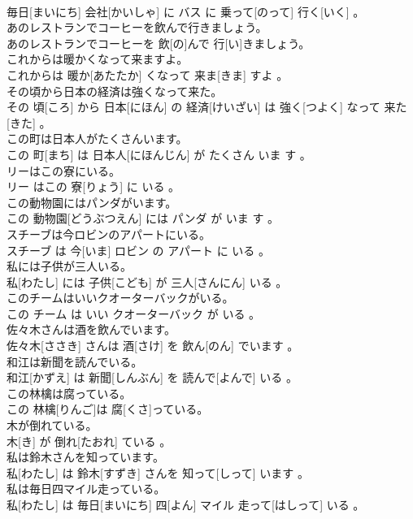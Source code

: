 \documentclass[8pt]{extreport}
\begin{document}
\begin{CJK}{UTF8}{min}
\\	毎日[まいにち] 会社[かいしゃ] に バス に 乗って[のって] 行く[いく] 。
\\	あのレストランでコーヒーを飲んで行きましょう。	
\\	あのレストランでコーヒーを 飲[の]んで 行[い]きましょう。
\\	これからは暖かくなって来ますよ。	
\\	これからは 暖か[あたたか] くなって 来ま[きま] すよ 。
\\	その頃から日本の経済は強くなって来た。	
\\	その 頃[ころ] から 日本[にほん] の 経済[けいざい] は 強く[つよく] なって 来た[きた] 。
\\	この町は日本人がたくさんいます。	
\\	この 町[まち] は 日本人[にほんじん] が たくさん いま す 。
\\	リーはこの寮にいる。	
\\	リー はこの 寮[りょう] に いる 。
\\	この動物園にはパンダがいます。	
\\	この 動物園[どうぶつえん] には パンダ が いま す 。
\\	スチーブは今ロビンのアパートにいる。	
\\	スチーブ は 今[いま] ロビン の アパート に いる 。
\\	私には子供が三人いる。	
\\	私[わたし] には 子供[こども] が 三人[さんにん] いる 。
\\	このチームはいいクオーターバックがいる。	
\\	この チーム は いい クオーターバック が いる 。
\\	佐々木さんは酒を飲んでいます。	
\\	佐々木[ささき] さんは 酒[さけ] を 飲ん[のん] でいます 。
\\	和江は新聞を読んでいる。	
\\	和江[かずえ] は 新聞[しんぶん] を 読んで[よんで] いる 。
\\	この林檎は腐っている。	
\\	この 林檎[りんご]は 腐[くさ]っている。
\\	木が倒れている。	
\\	木[き] が 倒れ[たおれ] ている 。
\\	私は鈴木さんを知っています。	
\\	私[わたし] は 鈴木[すずき] さんを 知って[しって] います 。
\\	私は毎日四マイル走っている。	
\\	私[わたし] は 毎日[まいにち] 四[よん] マイル 走って[はしって] いる 。

\end{CJK}
\end{document}
